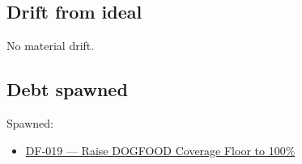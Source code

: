 \subsection{Drift from ideal}\label{record-080-drift-from-ideal}

No material drift.

\subsection{Debt spawned}\label{record-080-debt-spawned}

Spawned:

\begin{itemize}
\tightlist
\item
  \href{https://github.com/flyingrobots/bijou/blob/cbd70612140e7a450d764b3c7be1c6af878b99bc/docs/design/DF-019-raise-dogfood-coverage-floor-to-100-percent.md}{DF-019 --- Raise DOGFOOD Coverage Floor to 100\%}
\end{itemize}

